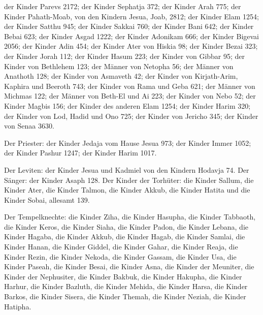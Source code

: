  der Kinder Parevs 2172;  der Kinder
Sephatja 372;  der Kinder Arah 775;  der
Kinder Pahath-Moab, von den Kindern Jesua, Joab, 2812; 
der Kinder Elam 1254;  der Kinder Satthu 945;
 der Kinder Sakkai 760;  der Kinder Bani
642;  der Kinder Bebai 623;  der Kinder
Asgad 1222;  der Kinder Adonikam 666;  der
Kinder Bigevai 2056;  der Kinder Adin 454;
 der Kinder Ater von Hiskia 98;  der
Kinder Bezai 323;  der Kinder Jorah 112; 
der Kinder Hasum 223;  der Kinder von Gibbar 95;
 der Kinder von Bethlehem 123;  der Männer
von Netopha 56;  der Männer von Anathoth 128;
 der Kinder von Asmaveth 42;  der Kinder
von Kirjath-Arim, Kaphira und Beeroth 743;  der Kinder
von Rama und Geba 621;  der Männer von Michmas 122;
 der Männer von Beth-El und Ai 223;  der
Kinder von Nebo 52;  der Kinder Magbis 156;
 der Kinder des anderen Elam 1254;  der
Kinder Harim 320;  der Kinder von Lod, Hadid und Ono 725;
 der Kinder von Jericho 345;  der Kinder
von Senaa 3630.

 Der Priester: der Kinder Jedaja vom Hause Jesua 973;
 der Kinder Immer 1052;  der Kinder Pashur
1247;  der Kinder Harim 1017.

 Der Leviten: der Kinder Jesua und Kadmiel von den
Kindern Hodavja 74.  Der Sänger: der Kinder Asaph 128.
 Der Kinder der Torhüter: die Kinder Sallum, die Kinder
Ater, die Kinder Talmon, die Kinder Akkub, die Kinder Hatita und die
Kinder Sobai, allesamt 139.

 Der Tempelknechte: die Kinder Ziha, die Kinder Hasupha,
die Kinder Tabbaoth,  die Kinder Keros, die Kinder Siaha,
die Kinder Padon,  die Kinder Lebana, die Kinder Hagaba,
die Kinder Akkub,  die Kinder Hagab, die Kinder Samlai,
die Kinder Hanan,  die Kinder Giddel, die Kinder Gahar,
die Kinder Reaja,  die Kinder Rezin, die Kinder Nekoda,
die Kinder Gassam,  die Kinder Usa, die Kinder Paseah,
die Kinder Besai,  die Kinder Asna, die Kinder der
Meuniter, die Kinder der Nephusiter,  die Kinder Bakbuk,
die Kinder Hakupha, die Kinder Harhur,  die Kinder
Bazluth, die Kinder Mehida, die Kinder Harsa,  die Kinder
Barkos, die Kinder Sisera, die Kinder Themah,  die Kinder
Neziah, die Kinder Hatipha.

